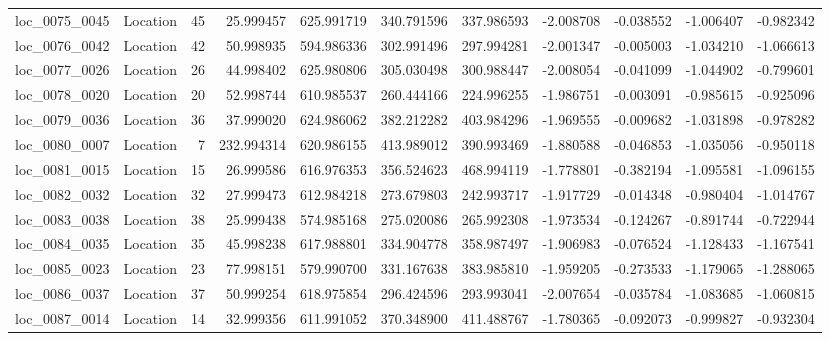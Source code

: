 \begin{tabular}{llrrrrrrrrr}
loc_0075_0045 &        Location &              45 &  25.999457 & 625.991719 &  340.791596 &    337.986593 &  -2.008708 &  -0.038552 &   -1.006407 &     -0.982342 \\
loc_0076_0042 &        Location &              42 &  50.998935 & 594.986336 &  302.991496 &    297.994281 &  -2.001347 &  -0.005003 &   -1.034210 &     -1.066613 \\
loc_0077_0026 &        Location &              26 &  44.998402 & 625.980806 &  305.030498 &    300.988447 &  -2.008054 &  -0.041099 &   -1.044902 &     -0.799601 \\
loc_0078_0020 &        Location &              20 &  52.998744 & 610.985537 &  260.444166 &    224.996255 &  -1.986751 &  -0.003091 &   -0.985615 &     -0.925096 \\
loc_0079_0036 &        Location &              36 &  37.999020 & 624.986062 &  382.212282 &    403.984296 &  -1.969555 &  -0.009682 &   -1.031898 &     -0.978282 \\
loc_0080_0007 &        Location &               7 & 232.994314 & 620.986155 &  413.989012 &    390.993469 &  -1.880588 &  -0.046853 &   -1.035056 &     -0.950118 \\
loc_0081_0015 &        Location &              15 &  26.999586 & 616.976353 &  356.524623 &    468.994119 &  -1.778801 &  -0.382194 &   -1.095581 &     -1.096155 \\
loc_0082_0032 &        Location &              32 &  27.999473 & 612.984218 &  273.679803 &    242.993717 &  -1.917729 &  -0.014348 &   -0.980404 &     -1.014767 \\
loc_0083_0038 &        Location &              38 &  25.999438 & 574.985168 &  275.020086 &    265.992308 &  -1.973534 &  -0.124267 &   -0.891744 &     -0.722944 \\
loc_0084_0035 &        Location &              35 &  45.998238 & 617.988801 &  334.904778 &    358.987497 &  -1.906983 &  -0.076524 &   -1.128433 &     -1.167541 \\
loc_0085_0023 &        Location &              23 &  77.998151 & 579.990700 &  331.167638 &    383.985810 &  -1.959205 &  -0.273533 &   -1.179065 &     -1.288065 \\
loc_0086_0037 &        Location &              37 &  50.999254 & 618.975854 &  296.424596 &    293.993041 &  -2.007654 &  -0.035784 &   -1.083685 &     -1.060815 \\
loc_0087_0014 &        Location &              14 &  32.999356 & 611.991052 &  370.348900 &    411.488767 &  -1.780365 &  -0.092073 &   -0.999827 &     -0.932304 \\

\end{tabular}
